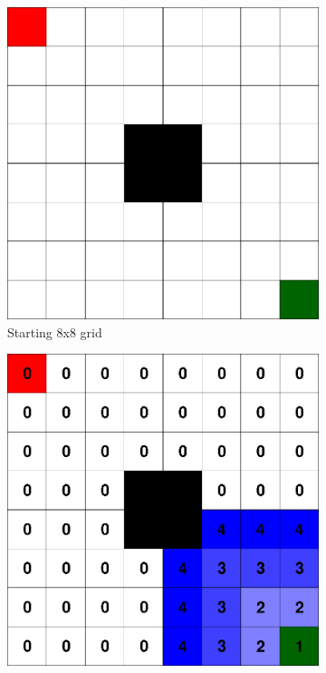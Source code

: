 \begin{figure}[]
  \centering
  \begin{subfigure}[b]{0.2\linewidth}
    \includegraphics[width=\linewidth]{images/simple_grid.png}
     \caption{Starting 8x8 grid}
  \end{subfigure}
  \hfill
  \begin{subfigure}[b]{0.2\linewidth}
    \includegraphics[width=\linewidth]{images/wave_front_planner_1.png}

\end{subfigure}
\end{figure}
